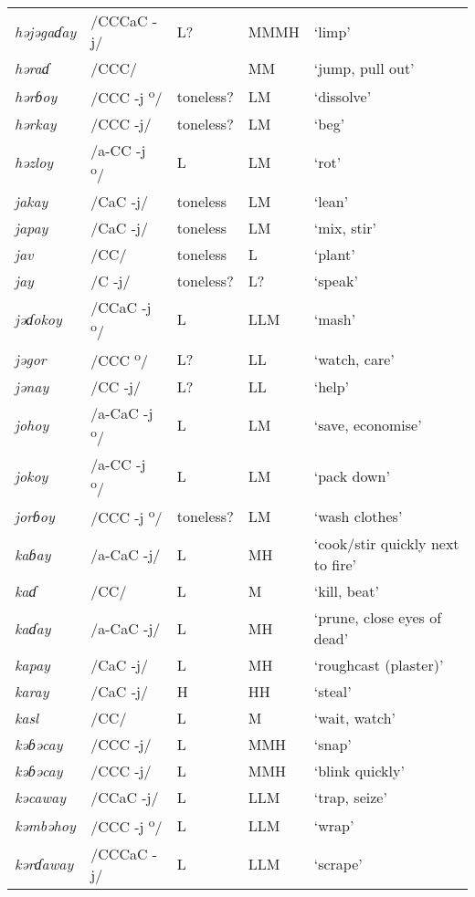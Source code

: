 \begin{small}
\begin{longtable}{lp{1.75cm}p{1.75cm}p{1.75cm}p{3cm}}
\textit{həjəgaɗay} & /CCCaC -j/ & L? & MMMH & ‘limp’\\
\textit{həraɗ} & /CCC/ &  & MM & ‘jump, pull out’\\
\textit{hərɓoy} & /CCC -j\textsuperscript{ o}/ & toneless? & LM & ‘dissolve’\\
\textit{hərkay} & /CCC -j/ & toneless? & LM & ‘beg’\\
\textit{həzloy} & /a-CC -j\textsuperscript{ o}/ & L & LM & ‘rot’\\
\textit{jakay} & /CaC -j/ & toneless & LM & ‘lean’\\
\textit{japay} & /CaC -j/ & toneless & LM & ‘mix, stir’\\
\textit{jav} & /CC/ & toneless & L & ‘plant’\\
\textit{jay} & /C -j/ & toneless? & L? & ‘speak’\\
\textit{jəɗokoy} & /CCaC -j\textsuperscript{ o}/ & L & LLM & ‘mash’\\
\textit{jəgor} & /CCC \textsuperscript{o}/ & L? & LL & ‘watch, care’\\
\textit{jənay} & /CC -j/ & L? & LL & ‘help’\\
\textit{johoy} & /a-CaC -j\textsuperscript{ o}/ & L & LM & ‘save, economise’\\
\textit{jokoy} & /a-CC -j\textsuperscript{ o}/ & L & LM & ‘pack down’\\
\textit{jorɓoy} & /CCC -j\textsuperscript{ o}/ & toneless? & LM & ‘wash clothes’\\
\textit{kaɓay} & /a-CaC -j/ & L & MH & ‘cook/stir quickly next to fire’\\
\textit{kaɗ} & /CC/ & L & M & ‘kill, beat’\\
\textit{kaɗay} & /a-CaC -j/ & L & MH & ‘prune, close eyes of dead’\\
\textit{kapay} & /CaC -j/ & L & MH & ‘roughcast (plaster)’\\
\textit{karay} & /CaC -j/ & H & HH & ‘steal’\\
\textit{kasl} & /CC/ & L & M & ‘wait, watch’\\
\textit{kəɓəcay} & /CCC -j/ & L & MMH & ‘snap’\\
\textit{kəɓəcay} & /CCC -j/ & L & MMH & ‘blink quickly’\\
\textit{kəcaway} & /CCaC -j/ & L & LLM & ‘trap, seize’\\
\textit{kəmbəhoy} & /CCC -j\textsuperscript{ o}/ & L & LLM & ‘wrap’\\
\textit{kərɗaway} & /CCCaC -j/ & L & LLM & ‘scrape’\\

\end{longtable}
\end{small}
